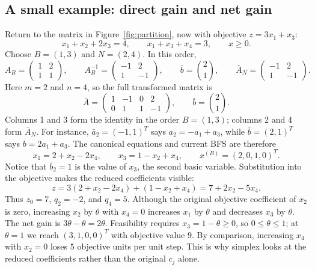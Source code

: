 \documentclass[11pt,a4paper]{article}
\begin{document}
\subsection{A small example: direct gain and net gain}
Return to the matrix in Figure~\ref{fig:partition}, now with objective
$z=3x_1+x_3$:
\[
  x_1+x_2+2x_3=4,\qquad x_1+x_3+x_4=3,\qquad x\geq0.
\]
Choose $B=(1,3)$ and $N=(2,4)$. In this order,
\[
  A_B=\begin{pmatrix}1&2\\1&1\end{pmatrix},\qquad
  A_B^{-1}=\begin{pmatrix}-1&2\\1&-1\end{pmatrix},\qquad
  \bar b=\binom21,\qquad
  \bar A_N=\begin{pmatrix}-1&2\\1&-1\end{pmatrix}.
\]
Here $m=2$ and $n=4$, so the full transformed matrix is
\[
  \bar A=\begin{pmatrix}1&-1&0&2\\0&1&1&-1\end{pmatrix},
  \qquad \bar b=\binom21.
\]
Columns 1 and 3 form the identity in the order $B=(1,3)$; columns 2 and 4
form $\bar A_N$. For instance, $\bar a_2=(-1,1)^T$ says
$a_2=-a_1+a_3$, while $\bar b=(2,1)^T$ says $b=2a_1+a_3$.
The canonical equations and current BFS are therefore
\[
  x_1=2+x_2-2x_4,\qquad x_3=1-x_2+x_4,
  \qquad x^{(B)}=(2,0,1,0)^T.
\]
Notice that $\bar b_2=1$ is the value of $x_3$, the second basic variable.
Substitution into the objective makes the reduced coefficients visible:
\[
  z=3(2+x_2-2x_4)+(1-x_2+x_4)
  =7+2x_2-5x_4.
\]
Thus $z_0=7$, $q_2=-2$, and $q_4=5$. Although the original objective
coefficient of $x_2$ is zero, increasing $x_2$ by $\theta$ with $x_4=0$
increases $x_1$ by $\theta$ and decreases $x_3$ by $\theta$. The net gain
is $3\theta-\theta=2\theta$. Feasibility requires
$x_3=1-\theta\geq0$, so $0\leq\theta\leq1$; at $\theta=1$ we reach
$(3,1,0,0)^T$ with objective value $9$. By comparison, increasing $x_4$
with $x_2=0$ loses $5$ objective units per unit step. This is why simplex
looks at the reduced coefficients rather than the original $c_j$ alone.
\end{document}
